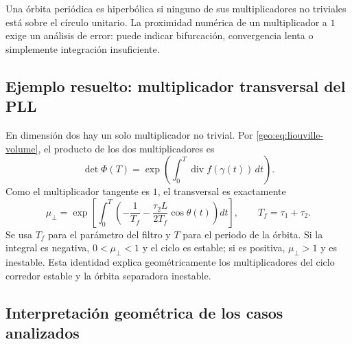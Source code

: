 

Una órbita periódica es hiperbólica si ninguno de sus multiplicadores no
triviales está sobre el círculo unitario. La proximidad numérica de un
multiplicador a \(1\) exige un análisis de error: puede indicar bifurcación,
convergencia lenta o simplemente integración insuficiente.

\subsection{Ejemplo resuelto: multiplicador transversal del PLL}

En dimensión dos hay un solo multiplicador no trivial. Por
\eqref{geo:eq:liouville-volume}, el producto de los dos multiplicadores es
\begin{equation}
 \det\Phi(T)=
 \exp\!\left(\int_0^T\operatorname{div}f(\gamma(t))\,dt\right).
\end{equation}
Como el multiplicador tangente es \(1\), el transversal es exactamente
\begin{equation}
 \mu_\perp=
 \exp\!\left[\int_0^T
 \left(-\frac1{T_{\!f}}
 -\frac{\tau_2L}{2T_{\!f}}\cos\theta(t)\right)dt\right],
 \qquad T_{\!f}=\tau_1+\tau_2.
 \label{geo:eq:pll-floquet-divergence}
\end{equation}
Se usa \(T_f\) para el parámetro del filtro y \(T\) para el periodo de la
órbita. Si la integral es negativa, \(0<\mu_\perp<1\) y el ciclo es estable;
si es positiva, \(\mu_\perp>1\) y es inestable. Esta identidad explica
geométricamente los multiplicadores del ciclo corredor estable
y la órbita separadora inestable.

\subsection{Interpretación geométrica de los casos analizados}

